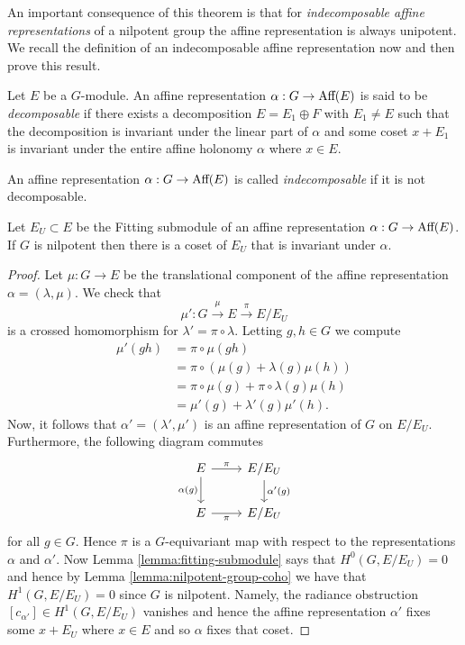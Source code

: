 An important consequence of this theorem is that for \emph{indecomposable
    affine representations} of a nilpotent group the affine representation is
always unipotent. We recall the definition of an indecomposable affine
representation now and then prove this result.

\begin{definition}
    Let $E$ be a $G$-module. An affine representation $\alpha: G \to \text{Aff}(E)$ is said to be \emph{decomposable} if there exists a decomposition
    $E = E_1 \oplus F$ with $E_1 \neq E$ such that the decomposition is invariant under the linear part of $\alpha$ and some coset $x+ E_1$ is invariant under the entire affine holonomy $\alpha$ where $x \in E$.
\end{definition}
\begin{definition}
    An affine representation $\alpha: G \to \text{Aff}(E)$ is called \emph{indecomposable} if it is not decomposable.
\end{definition}
\begin{lemma}\label{lemma:indecomposable-coset-invariant}
    Let $E_U \subset E$ be the Fitting submodule of an affine representation $\alpha: G \to  \text{Aff}(E)$. If $G$ is nilpotent then
    there is a coset of $E_U$ that is invariant under $\alpha$.
\end{lemma}
\begin{proof}
    Let $\mu: G \to E$ be the translational component of the affine representation $\alpha = (\lambda,\mu)$. We check that
    $$
        \mu': G \xrightarrow{\mu} E \xrightarrow{\pi} E/E_U
    $$
    is a crossed homomorphism for $\lambda' = \pi \circ\lambda$. Letting $g,h \in G$ we compute
    \begin{align*}
        \mu'(gh) & = \pi \circ \mu(gh)                              \\
                 & = \pi \circ (\mu(g) + \lambda(g)\mu(h))          \\
                 & = \pi \circ \mu (g) + \pi \circ \lambda(g)\mu(h) \\
                 & = \mu'(g) + \lambda'(g)\mu'(h).
    \end{align*}
    Now, it follows that $\alpha' = (\lambda', \mu')$ is an affine representation of $G$ on $E/E_U$. Furthermore, the following diagram commutes
    \[
        \begin{tikzcd}
            E \arrow[r, "\pi"] \arrow[d, "\alpha(g)"']
            & E/E_U \arrow[d, "\alpha^{\prime}(g)"] \\
            E \arrow[r, "\pi"']
            & E/E_U
        \end{tikzcd}
    \]
    for all $g \in G$. Hence $\pi$ is a $G$-equivariant map with respect to the
    representations $\alpha$ and $\alpha'$. Now Lemma \ref{lemma:fitting-submodule}
    says that $H^0(G, E/E_U)=0$ and hence by Lemma \ref{lemma:nilpotent-group-coho}
    we have that $H^1(G, E/E_U) = 0$ since $G$ is nilpotent. Namely, the radiance
    obstruction $[c_{\alpha'}] \in H^1(G, E/E_U)$ vanishes and hence the affine
    representation $\alpha'$ fixes some $x + E_U$ where $x \in E$ and so $\alpha$
    fixes that coset.
\end{proof}


